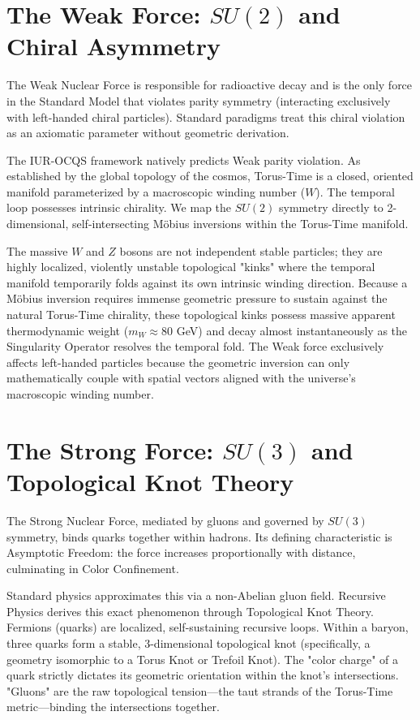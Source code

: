 \documentclass[12pt,openany]{book}
\begin{document}
\section{The Weak Force: $SU(2)$ and Chiral Asymmetry}
The Weak Nuclear Force is responsible for radioactive decay and is the only force in the Standard Model that violates parity symmetry (interacting exclusively with left-handed chiral particles). Standard paradigms treat this chiral violation as an axiomatic parameter without geometric derivation.

The IUR-OCQS framework natively predicts Weak parity violation. As established by the global topology of the cosmos, Torus-Time is a closed, oriented manifold parameterized by a macroscopic winding number ($W$). The temporal loop possesses intrinsic chirality. We map the $SU(2)$ symmetry directly to 2-dimensional, self-intersecting M\"{o}bius inversions within the Torus-Time manifold.

The massive $W$ and $Z$ bosons are not independent stable particles; they are highly localized, violently unstable topological "kinks" where the temporal manifold temporarily folds against its own intrinsic winding direction. Because a M\"{o}bius inversion requires immense geometric pressure to sustain against the natural Torus-Time chirality, these topological kinks possess massive apparent thermodynamic weight ($m_W \approx 80$ GeV) and decay almost instantaneously as the Singularity Operator resolves the temporal fold. The Weak force exclusively affects left-handed particles because the geometric inversion can only mathematically couple with spatial vectors aligned with the universe's macroscopic winding number.

\section{The Strong Force: $SU(3)$ and Topological Knot Theory}
The Strong Nuclear Force, mediated by gluons and governed by $SU(3)$ symmetry, binds quarks together within hadrons. Its defining characteristic is Asymptotic Freedom: the force increases proportionally with distance, culminating in Color Confinement. 

Standard physics approximates this via a non-Abelian gluon field. Recursive Physics derives this exact phenomenon through Topological Knot Theory. Fermions (quarks) are localized, self-sustaining recursive loops. Within a baryon, three quarks form a stable, 3-dimensional topological knot (specifically, a geometry isomorphic to a Torus Knot or Trefoil Knot). The "color charge" of a quark strictly dictates its geometric orientation within the knot's intersections. "Gluons" are the raw topological tension---the taut strands of the Torus-Time metric---binding the intersections together.
\end{document}
